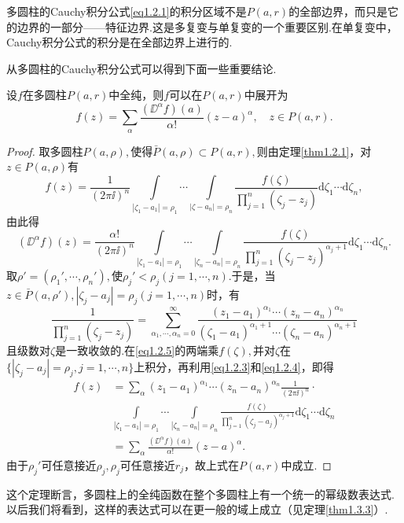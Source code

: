 多圆柱的Cauchy积分公式\eqref{eq1.2.1}的积分区域不是$P(a,r)$的全部边界，而只是它的边界的一部分——特征边界.这是多复变与单复变的一个重要区别.在单复变中，Cauchy积分公式的积分是在全部边界上进行的.

从多圆柱的Cauchy积分公式可以得到下面一些重要结论.
\begin{theorem}\label{thm1.2.2}
	设$f$在多圆柱$P(a,r)$中全纯，则$f$可以在$P(a,r)$中展开为
	\[f(z)=\sum_\alpha\frac{(\DD^\alpha f)(a)}{\alpha!}(z-a)^\alpha,\quad z\in P(a,r).\]
\end{theorem}
\begin{proof}
	取多圆柱$P(a,\rho),$使得$\bar{P}(a,\rho)\subset P(a,r),$则由定理\ref{thm1.2.1}，对$z\in P(a,\rho)$有
	\begin{equation}\label{eq1.2.3}
		f(z)=\frac1{(2\pi\ii)^n}\int\limits_{|\zeta_1-a_1|=\rho_1}\cdots\int\limits_{|\zeta-a_n|=\rho_n}\frac{f(\zeta)}{\prod\limits_{j=1}^{n}(\zeta_j-z_j)}\mathrm{d}\zeta_1\cdots\mathrm{d}\zeta_n,
	\end{equation}
由此得
\begin{equation}\label{eq1.2.4}
	(\DD^\alpha f)(z)
		=\frac{\alpha!}{(2\pi\ii)^n}\int\limits_{|\zeta_1-a_1|=\rho_1}\cdots\int\limits_{|\zeta_n-a_n|=\rho_n}\frac{f(\zeta)}{\prod\limits_{j=1}^{n}(\zeta_j-z_j)^{\alpha_j +1}}\mathrm{d}\zeta_1\cdots\mathrm{d}\zeta_n.
\end{equation}
取$\rho'=(\rho_1',\cdots,\rho_n'),$使$\rho_j'<\rho_j(j=1,\cdots,n)$.于是，当$z\in\bar{P}(a,\rho'),|\zeta_j-a_j|=\rho_j(j=1,\cdots,n)$时，有
\begin{equation}\label{eq1.2.5}
	\frac1{\prod\limits_{j=1}^{n}(\zeta_j-z_j)}=\sum_{\alpha_1,\cdots,\alpha_n=0}^\infty \frac{(z_1-a_1)^{\alpha_1}\cdots(z_n-a_n)^{\alpha_n}}{(\zeta_1-a_1)^{\alpha_1 +1}\cdots(\zeta_n-a_n)^{\alpha_n +1}}
\end{equation}
且级数对$\zeta$是一致收敛的.在\eqref{eq1.2.5}的两端乘$f(\zeta),$并对$\zeta$在$\{|\zeta_j-a_j|=\rho_j,j=1,\cdots,n\}$上积分，再利用\eqref{eq1.2.3}和\eqref{eq1.2.4}，即得
\begin{align*}
	f(z)
	&=\sum_\alpha (z_1-a_1)^{\alpha_1}\cdots (z_n-a_n)^{\alpha_n} \frac1{(2\pi\ii)^n}\cdot\\
	&\int\limits_{|\zeta_1-a_1|=\rho_1}\cdots\int\limits_{|\zeta_n-a_n|=\rho_n}\frac{f(\zeta)}{\prod\limits_{j=1}^{n}(\zeta_j-a_j)^{\alpha_j+1}}\mathrm{d}\zeta_1\cdots\mathrm{d}\zeta_n\\
	&=\sum_\alpha\frac{(\DD^\alpha f)(a)}{\alpha!}(z-a)^\alpha .
\end{align*}
由于$\rho_j'$可任意接近$\rho_j,\rho_j$可任意接近$r_j$，故上式在$P(a,r)$中成立.
\end{proof}
这个定理断言，多圆柱上的全纯函数在整个多圆柱上有一个统一的幂级数表达式.以后我们将看到，这样的表达式可以在更一般的域上成立（见定理\ref{thm1.3.3}）.

